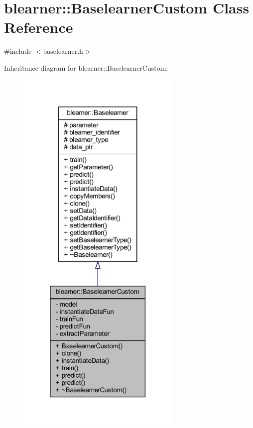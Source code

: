 \hypertarget{classblearner_1_1_baselearner_custom}{}\section{blearner\+:\+:Baselearner\+Custom Class Reference}
\label{classblearner_1_1_baselearner_custom}


{\ttfamily \#include $<$baselearner.\+h$>$}



Inheritance diagram for blearner\+:\+:Baselearner\+Custom\+:\nopagebreak
\begin{figure}[H]
\begin{center}
\leavevmode
\includegraphics[width=223pt]{classblearner_1_1_baselearner_custom__inherit__graph}
\end{center}
\end{figure}


